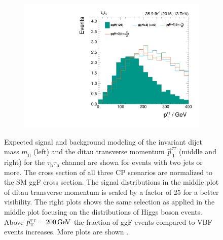 \begin{figure}[h!]
\begin{subfigure}{.32\textwidth}
        \includegraphics[width=\textwidth]{Figures/eventselection/Categorization/tt/H_pt_log.pdf}
    \end{subfigure}%
    \caption[Background modeling in the \textit{dijet lowboost} and \textit{dijet boosted} categories.]{Expected signal and background modeling of the invariant dijet mass $m_\text{jj}$ (left) and the ditau transverse momentum $\vec{p}_{\text{T}}^{\tau\tau}$ (middle and right) for the $\tau_\text{h}\tau_\text{h}$ channel are shown for events with two jets or more. The cross section of all three CP scenarios are normalized to the SM ggF cross section. 
    The signal distributions in the middle plot of ditau transverse momentum is scaled by a factor of 25 for a better visibility.
    The right plots shows the same selection as applied in the middle plot focusing on the distributions of Higgs boson events. Above  $\vec{p}_{\text{T}}^{\tau\tau}=\text{200\,{GeV}}$ the fraction of ggF events compared to VBF events increases. More plots are shown .}\label{ES:categorization:tt_distributions}
\end{figure}

